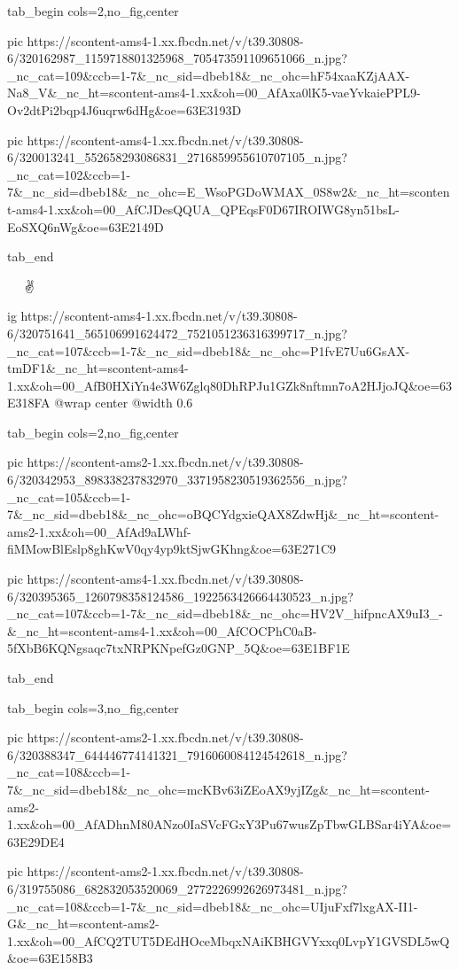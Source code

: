 \ifcmt
  tab_begin cols=2,no_fig,center

     pic https://scontent-ams4-1.xx.fbcdn.net/v/t39.30808-6/320162987_1159718801325968_705473591109651066_n.jpg?_nc_cat=109&ccb=1-7&_nc_sid=dbeb18&_nc_ohc=hF54xaaKZjAAX-Na8_V&_nc_ht=scontent-ams4-1.xx&oh=00_AfAxa0lK5-vaeYvkaiePPL9-Ov2dtPi2bqp4J6uqrw6dHg&oe=63E3193D

     pic https://scontent-ams4-1.xx.fbcdn.net/v/t39.30808-6/320013241_552658293086831_2716859955610707105_n.jpg?_nc_cat=102&ccb=1-7&_nc_sid=dbeb18&_nc_ohc=E_WsoPGDoWMAX_0S8w2&_nc_ht=scontent-ams4-1.xx&oh=00_AfCJDesQQUA_QPEqsF0D67IROIWG8yn51bsL-EoSXQ6nWg&oe=63E2149D

  tab_end
\fi


💖🙌🙏🙏🙏✌

\ifcmt
  ig https://scontent-ams4-1.xx.fbcdn.net/v/t39.30808-6/320751641_565106991624472_7521051236316399717_n.jpg?_nc_cat=107&ccb=1-7&_nc_sid=dbeb18&_nc_ohc=P1fvE7Uu6GsAX-tmDF1&_nc_ht=scontent-ams4-1.xx&oh=00_AfB0HXiYn4e3W6Zglq80DhRPJu1GZk8nftmn7oA2HJjoJQ&oe=63E318FA
  @wrap center
  @width 0.6
\fi


\ifcmt
  tab_begin cols=2,no_fig,center

    pic https://scontent-ams2-1.xx.fbcdn.net/v/t39.30808-6/320342953_898338237832970_3371958230519362556_n.jpg?_nc_cat=105&ccb=1-7&_nc_sid=dbeb18&_nc_ohc=oBQCYdgxieQAX8ZdwHj&_nc_ht=scontent-ams2-1.xx&oh=00_AfAd9aLWhf-fiMMowBlEslp8ghKwV0qy4yp9ktSjwGKhng&oe=63E271C9

    pic https://scontent-ams4-1.xx.fbcdn.net/v/t39.30808-6/320395365_1260798358124586_1922563426664430523_n.jpg?_nc_cat=107&ccb=1-7&_nc_sid=dbeb18&_nc_ohc=HV2V_hifpncAX9uI3_-&_nc_ht=scontent-ams4-1.xx&oh=00_AfCOCPhC0aB-5fXbB6KQNgsaqc7txNRPKNpefGz0GNP_5Q&oe=63E1BF1E

  tab_end
\fi

\ifcmt
  tab_begin cols=3,no_fig,center

    pic https://scontent-ams2-1.xx.fbcdn.net/v/t39.30808-6/320388347_644446774141321_7916060084124542618_n.jpg?_nc_cat=108&ccb=1-7&_nc_sid=dbeb18&_nc_ohc=mcKBv63iZEoAX9yjIZg&_nc_ht=scontent-ams2-1.xx&oh=00_AfADhnM80ANzo0IaSVcFGxY3Pu67wusZpTbwGLBSar4iYA&oe=63E29DE4

    pic https://scontent-ams2-1.xx.fbcdn.net/v/t39.30808-6/319755086_682832053520069_2772226992626973481_n.jpg?_nc_cat=108&ccb=1-7&_nc_sid=dbeb18&_nc_ohc=UIjuFxf7lxgAX-II1-G&_nc_ht=scontent-ams2-1.xx&oh=00_AfCQ2TUT5DEdHOceMbqxNAiKBHGVYxxq0LvpY1GVSDL5wQ&oe=63E158B3

